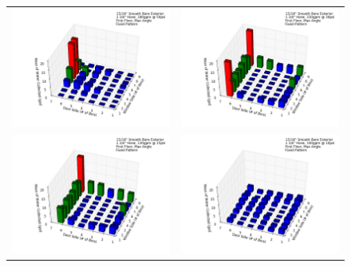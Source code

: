 \documentclass{article}
\begin{document}
\begin{appendices}
\clearpage

\begin{figure}[ht]
\begin{tabular*}{\textwidth}{lr}
\includegraphics[width=3.2in]{../ADD_Analysis/Figures/15-12-08_153737_Datafile_15_16in_Smooth_Bore_Exterior.png} &
\includegraphics[width=3.2in]{../ADD_Analysis/Figures/15-12-08_154306_Datafile_15_16in_Smooth_Bore_Exterior.png} \\
\includegraphics[width=3.2in]{../ADD_Analysis/Figures/15-12-08_154812_Datafile_15_16in_Smooth_Bore_Exterior.png} &
\includegraphics[width=3.2in]{../ADD_Analysis/Figures/15-12-08_155710_Datafile_15_16in_Smooth_Bore_Exterior.png} \\

\end{tabular*}
\end{figure}
\end{appendices}
\end{document}
